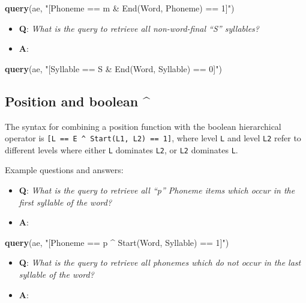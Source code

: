 \documentclass[]{book}
\newenvironment{Shaded}{\begin{snugshade}}{\end{snugshade}}
\newcommand{\KeywordTok}[1]{\textcolor[rgb]{0.13,0.29,0.53}{\textbf{#1}}}
\newcommand{\NormalTok}[1]{#1}
\newcommand{\StringTok}[1]{\textcolor[rgb]{0.31,0.60,0.02}{#1}}
\providecommand{\tightlist}{%
  \setlength{\itemsep}{0pt}\setlength{\parskip}{0pt}}
\theoremstyle{definition}
\theoremstyle{definition}
\theoremstyle{definition}
\theoremstyle{remark}
\begin{document}
\begin{Shaded}
\begin{Highlighting}[]
\KeywordTok{query}\NormalTok{(ae, }\StringTok{"[Phoneme == m & End(Word, Phoneme) == 1]"}\NormalTok{)}
\end{Highlighting}
\end{Shaded}

\begin{itemize}
\tightlist
\item
  \textbf{Q}: \emph{What is the query to retrieve all non-word-final
  ``S'' syllables?}
\item
  \textbf{A}:
\end{itemize}

\begin{Shaded}
\begin{Highlighting}[]
\KeywordTok{query}\NormalTok{(ae, }\StringTok{"[Syllable == S & End(Word, Syllable) == 0]"}\NormalTok{)}
\end{Highlighting}
\end{Shaded}

\hypertarget{position-and-boolean-1}{%
\subsection{Position and boolean \^{}}\label{position-and-boolean-1}}

The syntax for combining a position function with the boolean
hierarchical operator is
\texttt{{[}L\ ==\ E\ \^{}\ Start(L1,\ L2)\ ==\ 1{]}}, where level
\texttt{L} and level \texttt{L2} refer to different levels where either
\texttt{L} dominates \texttt{L2}, or \texttt{L2} dominates \texttt{L}.

Example questions and answers:

\begin{itemize}
\tightlist
\item
  \textbf{Q}: \emph{What is the query to retrieve all ``p'' Phoneme
  items which occur in the first syllable of the word?}
\item
  \textbf{A}:
\end{itemize}

\begin{Shaded}
\begin{Highlighting}[]
\KeywordTok{query}\NormalTok{(ae, }\StringTok{"[Phoneme == p ^ Start(Word, Syllable) == 1]"}\NormalTok{)}
\end{Highlighting}
\end{Shaded}

\begin{itemize}
\tightlist
\item
  \textbf{Q}: \emph{What is the query to retrieve all phonemes which do
  not occur in the last syllable of the word?}
\item
  \textbf{A}:
\end{itemize}
\end{document}
